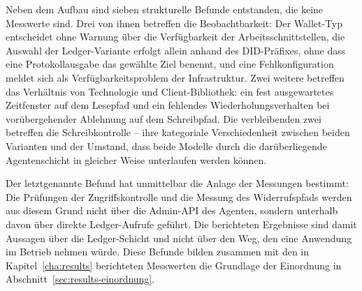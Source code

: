 Neben dem Aufbau sind sieben strukturelle Befunde entstanden, die keine Messwerte sind. Drei von ihnen betreffen die Beobachtbarkeit: Der Wallet-Typ entscheidet ohne Warnung über die Verfügbarkeit der Arbeitsschnittstellen, die Auswahl der Ledger-Variante erfolgt allein anhand des DID-Präfixes, ohne dass eine Protokollausgabe das gewählte Ziel benennt, und eine Fehlkonfiguration meldet sich als Verfügbarkeitsproblem der Infrastruktur. Zwei weitere betreffen das Verhältnis von Technologie und Client-Bibliothek: ein fest ausgewartetes Zeitfenster auf dem Lesepfad und ein fehlendes Wiederholungsverhalten bei vorübergehender Ablehnung auf dem Schreibpfad. Die verbleibenden zwei betreffen die Schreibkontrolle -- ihre kategoriale Verschiedenheit zwischen beiden Varianten und der Umstand, dass beide Modelle durch die darüberliegende Agentenschicht in gleicher Weise unterlaufen werden können.

Der letztgenannte Befund hat unmittelbar die Anlage der Messungen bestimmt: Die Prüfungen der Zugriffskontrolle und die Messung des Widerrufspfads werden aus diesem Grund nicht über die Admin-API des Agenten, sondern unterhalb davon über direkte Ledger-Aufrufe geführt. Die berichteten Ergebnisse sind damit Aussagen über die Ledger-Schicht und nicht über den Weg, den eine Anwendung im Betrieb nehmen würde. Diese Befunde bilden zusammen mit den in Kapitel~\ref{cha:results} berichteten Messwerten die Grundlage der Einordnung in Abschnitt~\ref{sec:results-einordnung}.